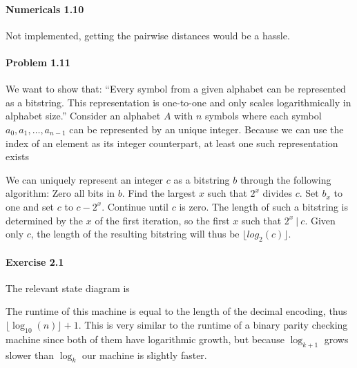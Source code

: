 \documentclass{article}
\begin{document}
\paragraph{Numericals 1.10} Not implemented, getting the pairwise distances would be a hassle.

\paragraph{Problem 1.11} We want to show that: \enquote{Every symbol from a given alphabet can be represented as a bitstring. This representation is one-to-one and only scales logarithmically in alphabet size.} Consider an alphabet $A$ with $n$ symbols where each symbol $a_0, a_1, \ldots, a_{n - 1}$ can be represented by an unique integer. Because we can use the index of an element as its integer counterpart, at least one such representation exists

We can uniquely represent an integer $c$ as a bitstring $b$ through the following algorithm: Zero all bits in $b$. Find the largest $x$ such that $2^x$ divides $c$. Set $b_x$ to one and set $c$ to $c - 2^x$. Continue until $c$ is zero. The length of such a bitstring is determined by the $x$ of the first iteration, so the first $x$ such that $2^x\ |\ c$. Given only $c$, the length of the resulting bitstring will thus be $\lfloor log_2(c) \rfloor$.

\paragraph{Exercise 2.1} The relevant state diagram is
\begin{center}
\end{center}
The runtime of this machine is equal to the length of the decimal encoding, thus $\lfloor \log_{10}(n) \rfloor + 1$. This is very similar to the runtime of a binary parity checking machine since both of them have logarithmic growth, but because $\log_{k + 1}$ grows slower than $\log_{k}$ our machine is slightly faster.
\end{document}
